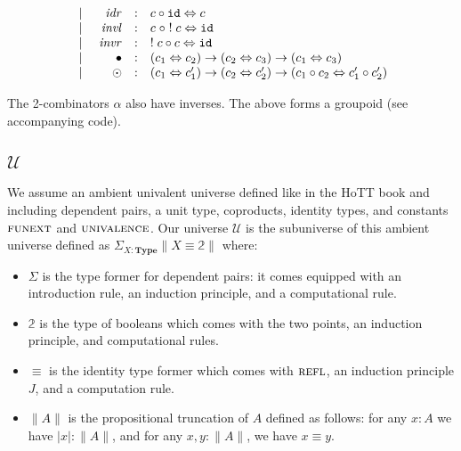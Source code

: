 \documentclass[format=acmlarge,review,natbib]{acmart}
\newcommand{\id}{\texttt{id}}
\newcommand{\compc}[2]{#1 \circ #2}
\newcommand{\alt}{~\mid~}
\newcommand{\invc}[1]{!\;#1}
\newcommand{\reflp}{\textsc{refl}}
\newcommand{\invl}{\mathit{invl}}
\newcommand{\invr}{\mathit{invr}}
\newcommand{\idrc}{\mathit{idr}}
\newcommand{\isotwo}{\Leftrightarrow}
\begin{document}
\[\begin{array}{rcl}
\begin{array}[t]{lrcl}
               \alt & \idrc &:& \compc{c}{\id} \isotwo c \\
               \alt & \invl &:& \compc{c\;}{\;\invc{c}} \isotwo \id \\
               \alt & \invr &:& \compc{\invc{c}}{c} \isotwo \id \\
               \alt & \bullet &:& (c_1 \isotwo c_2) \to (c_2 \isotwo c_3)
                                            \to (c_1 \isotwo c_3) \\
               \alt & \odot &:& (c_1 \isotwo c_1') \to (c_2 \isotwo c_2')
                                            \to (\compc{c_1}{c_2} \isotwo \compc{c_1'}{c_2'}) \\
             \end{array}
\end{array}\]

The 2-combinators $\alpha$ also have inverses. The above forms a groupoid (see
accompanying code).

\subsection{$\mathcal{U}$}

We assume an ambient univalent universe defined like in the HoTT book and including dependent pairs, a unit type, coproducts, identity types, and constants $\textsc{funext}$ and $\textsc{univalence}$. Our universe $\mathcal{U}$ is the subuniverse of this ambient universe defined as $\Sigma_{X:\mathbf{Type}} \| X \equiv \mathbb{2} \|$ where:

\begin{itemize}

\item $\Sigma$ is the type former for dependent pairs: it comes equipped with an introduction rule, an induction principle, and a computational rule.

\item $\mathbb{2}$ is the type of booleans which comes with the two points, an induction principle, and computational rules.

\item $\equiv$ is the identity type former which comes with $\reflp$, an induction principle $J$, and a computation rule.

\item $\| A \|$ is the propositional truncation of $A$ defined as follows: for
  any $x:A$ we have $|x| : \|A\|$, and for any $x,y : \|A\|$, we have $x \equiv y$.

\end{itemize}
\end{document}
